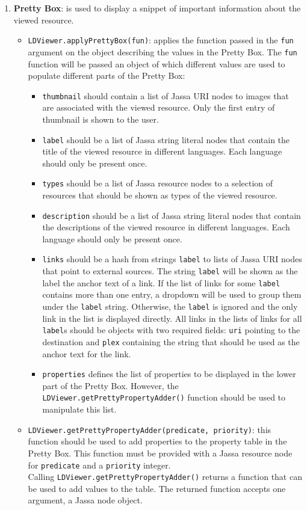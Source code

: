 \documentclass{article}
\begin{document}
\begin{enumerate}
\item \textbf{Pretty Box}: is used to display a snippet of important information about the viewed resource.
\begin{itemize}
\item \texttt{LDViewer.applyPrettyBox(fun)}: applies the function passed in the \texttt{fun} argument on the object describing the values in the Pretty Box.
The \texttt{fun} function will be passed an object of which different values are used to populate different parts of the Pretty Box:
\begin{itemize}
\item \texttt{thumbnail} should contain a list of Jassa URI nodes to images that are associated with the viewed resource.
Only the first entry of thumbnail is shown to the user.
\item \texttt{label} should be a list of Jassa string literal nodes that contain the title of the viewed resource in different languages.
Each language should only be present once.
\item \texttt{types} should be a list of Jassa resource nodes to a selection of resources that should be shown as types of the viewed resource.
\item \texttt{description} should be a list of Jassa string literal nodes that contain the descriptions of the viewed resource in different languages.
Each language should only be present once.
\item \texttt{links} should be a hash from strings \texttt{label} to lists of Jassa URI nodes that point to external sources. The string \texttt{label} will be shown as the label the anchor text of a link. If the list of links for some \texttt{label} contains more than one entry, a dropdown will be used to group them under the \texttt{label} string. Otherwise, the \texttt{label} is ignored and the only link in the list is displayed directly.
All links in the lists of links for all \texttt{label}s should be objects with two required fields: \texttt{uri} pointing to the destination and \texttt{plex} containing the string that should be used as the anchor text for the link.
\item \texttt{properties} defines the list of properties to be displayed in the lower part of the Pretty Box. However, the \texttt{LDViewer.getPrettyPropertyAdder()} function should be used to manipulate this list.
\end{itemize}

\item \texttt{LDViewer.getPrettyPropertyAdder(predicate, priority)}: this function should be used to add properties to the property table in the Pretty Box.
This function must be provided with a Jassa resource node for \texttt{predicate} and a \texttt{priority} integer.\\
Calling \texttt{LDViewer.getPrettyPropertyAdder()} returns a function that can be used to add values to the table. The returned function accepts one argument, a Jassa node object.
\end{itemize}


\end{enumerate}
\end{document}
